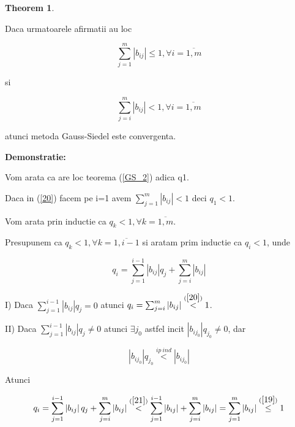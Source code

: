 \documentclass[a4paper,twoside]{book}
\newtheorem{theorem}{Theorem}
\begin{document}
\begin{theorem}
\label{GS_3}
\end{theorem}

Daca urmatoarele afirmatii au loc

\begin{equation}
\sum_{j=1}^{m}\left\vert b_{ij}\right\vert \leq 1,\forall i=\overline{1,m}
\label{19}
\end{equation}

si

\begin{equation}
\sum_{j=i}^{m}\left\vert b_{ij}\right\vert <1,\forall i=\overline{1,m}
\label{20}
\end{equation}

atunci metoda Gauss-Siedel este convergenta.

\textbf{Demonstratie:}

Vom arata ca are loc teorema (\ref{GS_2}) adica q\TEXTsymbol{<}1.

Daca in (\ref{20}) facem pe i=1 avem $\sum_{j=1}^{m}\left\vert
b_{ij}\right\vert <1$ deci $q_{1}<1$.

Vom arata prin inductie ca $q_{k}<1,\forall k=\overline{1,m}$.

Presupunem ca $q_{k}<1,\forall k=\overline{1,i-1}$ si aratam prim inductie
ca $q_{i}<1$, unde

\begin{equation*}
q_{i}=\sum_{j=1}^{i-1}\left\vert b_{ij}\right\vert
q_{j}+\sum_{j=i}^{m}\left\vert b_{ij}\right\vert
\end{equation*}

I) Daca $\sum_{j=1}^{i-1}\left\vert b_{ij}\right\vert q_{j}=0$ atunci $%
q_{i}=\sum_{j=i}^{m}\left\vert b_{ij}\right\vert \overset{(\ref{20})}{<}1$.

II) Daca $\sum_{j=1}^{i-1}\left\vert b_{ij}\right\vert q_{j}\neq 0$ atunci $%
\exists j_{0}$ astfel incit $\left\vert b_{ij_{0}}\right\vert q_{j_{0}}\neq
0 $, dar

\begin{equation}
\left\vert b_{ij_{0}}\right\vert q_{j_{0}}\overset{ip\:ind}{<}\left\vert
b_{ij_{0}}\right\vert  \label{21}
\end{equation}

Atunci

\begin{equation*}
q_{i}=\sum_{j=1}^{i-1}\left\vert b_{ij}\right\vert
q_{j}+\sum_{j=i}^{m}\left\vert b_{ij}\right\vert \overset{(\ref{21})}{<}%
\sum_{j=1}^{i-1}\left\vert b_{ij}\right\vert +\sum_{j=i}^{m}\left\vert
b_{ij}\right\vert =\sum_{j=1}^{m}\left\vert b_{ij}\right\vert \overset{(\ref%
{19})}{\leq }1
\end{equation*}
\end{document}
